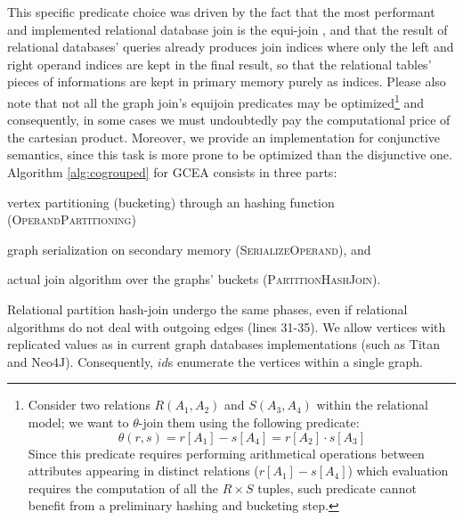 		

		
		
	This specific predicate choice was driven by the fact that the most performant
	and implemented relational database join is the equi-join \cite{SchuhCD16}, and that the result of relational databases' queries already produces join indices \cite{dittrich} where only the left and right operand indices are kept in the final result, so that the relational tables' pieces of informations are kept in primary memory purely as indices. Please also note that not all the graph join's equijoin predicates may be optimized\footnote{Consider two relations $R(A_1,A_2)$ and $S(A_3,A_4)$ within the relational model; we want to $\theta$-join them using the following predicate:
	\[\theta(r,s)=r[A_1]-s[A_4]=r[A_2]\cdot s[A_3]\]
Since this predicate requires performing arithmetical operations between attributes appearing in distinct relations ($r[A_1]-s[A_4]$) which evaluation requires the computation of all the $R\times S$ tuples, such predicate cannot benefit from a preliminary hashing and bucketing step.} and consequently, in some cases we must undoubtedly pay the computational price of the cartesian product.
	Moreover, we provide an implementation for {conjunctive semantics}, since this task is more prone to be
	optimized than the disjunctive one. Algorithm \ref{alg:cogrouped} for GCEA
	consists in three parts: \begin{enumerate*}[label=\textit{(\roman*)}]
		\item vertex partitioning (bucketing) through an hashing function (\textsc{Operand\-Partitioning})
		\item graph serialization on secondary memory (\textsc{SerializeOperand}), and
		\item actual join algorithm over the  graphs' buckets (\textsc{Par\-ti\-tion\-HashJoin}).
	\end{enumerate*}
	Relational partition hash-join undergo the same phases, even if relational algorithms
	do not deal with outgoing edges (lines 31-35).
	We allow vertices with replicated values as in current graph databases
	implementations (such as Titan and Neo4J). Consequently, $id$s enumerate the vertices
	within a single graph.

